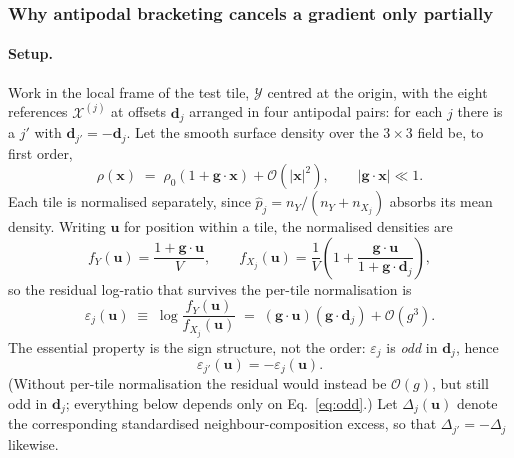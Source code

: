 \documentclass[11pt,a4paper]{article}
\newcommand{\vb}[1]{\bm{#1}}                 %
\newcommand{\gvec}{\vb{g}}                   %
\newcommand{\dvec}{\vb{d}}                   %
\newcommand{\uvec}{\vb{u}}                   %
\newcommand{\xvec}{\vb{x}}                   %
\newcommand{\Ycal}{\mathcal{Y}}              %
\newcommand{\Xcal}{\mathcal{X}}              %
\newcommand{\eps}{\varepsilon}               %
\newcommand{\Ocal}{\mathcal{O}}              %
\newcommand{\Ycal}{\mathcal{Y}}
\newcommand{\Xcal}{\mathcal{X}}
\newcommand{\dvec}{\vec{d}}
\begin{document}
\subsubsection{Why antipodal bracketing cancels a gradient only partially}

\paragraph{Setup.}
Work in the local frame of the test tile, $\Ycal$ centred at the origin, with the
eight references $\Xcal^{(j)}$ at offsets $\dvec_j$ arranged in four antipodal pairs:
for each $j$ there is a $j'$ with $\dvec_{j'}=-\dvec_j$. Let the smooth surface
density over the $3\times3$ field be, to first order,
%
\begin{equation}
\rho(\xvec) \;=\; \rho_0\left(1+\gvec\cdot\xvec\right)+\Ocal(|\xvec|^2),
\qquad |\gvec\cdot\xvec|\ll1 .
\end{equation}
%
Each tile is normalised separately, since $\hat p_j=n_Y/(n_Y+n_{X_j})$ absorbs its
mean density. Writing $\uvec$ for position within a tile, the normalised densities are
%
\begin{equation}
f_Y(\uvec)=\frac{1+\gvec\cdot\uvec}{V},
\qquad
f_{X_j}(\uvec)=\frac{1}{V}\left(1+\frac{\gvec\cdot\uvec}{1+\gvec\cdot\dvec_j}\right),
\end{equation}
%
so the residual log-ratio that survives the per-tile normalisation is
%
\begin{equation}
\eps_j(\uvec)\;\equiv\;\log\frac{f_Y(\uvec)}{f_{X_j}(\uvec)}
\;=\;(\gvec\cdot\uvec)(\gvec\cdot\dvec_j)+\Ocal(g^3).
\label{eq:eps}
\end{equation}
%
The essential property is the sign structure, not the order: $\eps_j$ is
\emph{odd} in $\dvec_j$, hence
%
\begin{equation}
\eps_{j'}(\uvec)=-\eps_j(\uvec).
\label{eq:odd}
\end{equation}
%
(Without per-tile normalisation the residual would instead be $\Ocal(g)$, but still
odd in $\dvec_j$; everything below depends only on Eq.~\eqref{eq:odd}.)
Let $\Delta_j(\uvec)$ denote the corresponding standardised neighbour-composition
excess, so that $\Delta_{j'}=-\Delta_j$ likewise.
\end{document}
